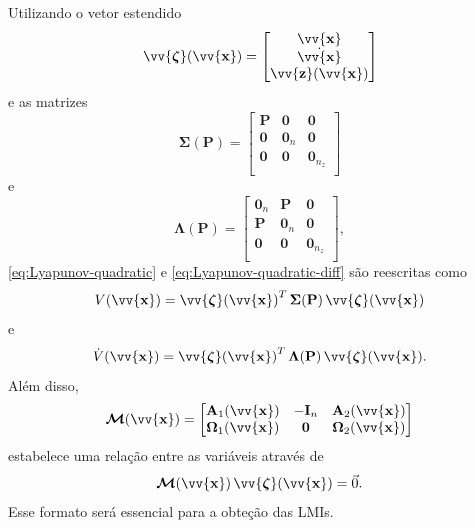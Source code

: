\documentclass{ppgeesa}
\newcommand*{\Prod}{\,}
\newcommand*{\Bold}[1]{\boldsymbol{\mathbf{#1}}}
\newcommand*{\Matr}[1]{\Bold{#1}}
\newcommand*{\Vect}[1]{\vv{\Bold{#1}}}
\newcommand*{\Transp}[1]{{#1}^{T}}
\begin{document}
Utilizando o vetor estendido
\begin{equation}\label{eq:zeta}
  \Vect{\zeta}(\Vect{x}) = \begin{bmatrix} \Vect{x} \\ \dot{\Vect{x}} \\ \Vect{z}(\Vect{x}) \end{bmatrix}
\end{equation}
e as matrizes
\begin{equation}
  \Matr{\Sigma}(\Matr{P}) = \begin{bmatrix}
    \Matr{P}  & \Matr{0}   & \Matr{0}       \\
    \Matr{0}  & \Matr{0}_n & \Matr{0}       \\
    \Matr{0}  & \Matr{0}   & \Matr{0}_{n_z} \\
  \end{bmatrix}
\end{equation}
e
\begin{equation}
  \Matr{\Lambda}(\Matr{P}) = \begin{bmatrix}
    \Matr{0}_n & \Matr{P}   & \Matr{0}       \\
    \Matr{P}   & \Matr{0}_n & \Matr{0}       \\
    \Matr{0}   & \Matr{0}   & \Matr{0}_{n_z} \\
  \end{bmatrix}
  ,
\end{equation}
\eqref{eq:Lyapunov-quadratic} e \eqref{eq:Lyapunov-quadratic-diff} são reescritas como
\begin{equation}\label{eq:Lyapunov-extended}
  V(\Vect{x}) = \Transp{\Vect{\zeta}(\Vect{x})} \Prod \Matr{\Sigma}(\Matr{P}) \Prod \Vect{\zeta}(\Vect{x})
\end{equation}
e
\begin{equation}\label{eq:Lyapunov-diff-extended}
  \dot{V}(\Vect{x}) = \Transp{\Vect{\zeta}(\Vect{x})} \Prod \Matr{\Lambda}(\Matr{P}) \Prod \Vect{\zeta}(\Vect{x})
  .
\end{equation}
Além disso,
\begin{equation}
  \Matr{\mathcal{M}}(\Vect{x}) = \begin{bmatrix}
    \Matr{A}_1(\Vect{x})      & -\Matr{I}_n & \Matr{A}_2(\Vect{x})      \\
    \Matr{\Omega}_1(\Vect{x}) & \Matr{0}    & \Matr{\Omega}_2(\Vect{x}) \\
  \end{bmatrix}
\end{equation}
estabelece uma relação entre as variáveis através de
\begin{equation}\label{eq:M-zeta}
  \Matr{\mathcal{M}}(\Vect{x}) \Prod \Vect{\zeta}(\Vect{x}) = \vec{0}
  .
\end{equation}
Esse formato será essencial para a obteção das LMIs.
\end{document}
